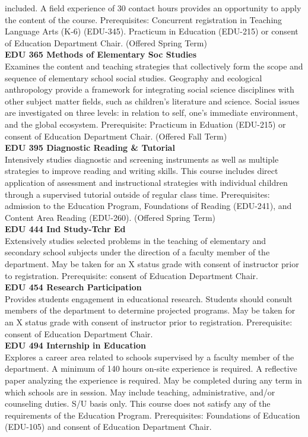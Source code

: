 \documentclass[
  letterpaper,
]{scrbook}
\begin{document}
included. A field experience of 30 contact hours provides an opportunity
to apply the content of the course. Prerequisites: Concurrent
registration in Teaching Language Arts (K-6) (EDU-345). Practicum in
Education (EDU-215) or consent of Education Department Chair. (Offered
Spring Term)\\
\textbf{EDU 365 Methods of Elementary Soc Studies}\\
Examines the content and teaching strategies that collectively form the
scope and sequence of elementary school social studies. Geography and
ecological anthropology provide a framework for integrating social
science disciplines with other subject matter fields, such as children's
literature and science. Social issues are investigated on three levels:
in relation to self, one's immediate environment, and the global
ecosystem. Prerequisite: Practicum in Eduation (EDU-215) or consent of
Education Department Chair. (Offered Fall Term)\\
\textbf{EDU 395 Diagnostic Reading \& Tutorial}\\
Intensively studies diagnostic and screening instruments as well as
multiple strategies to improve reading and writing skills. This course
includes direct application of assessment and instructional strategies
with individual children through a supervised tutorial outside of
regular class time. Prerequisites: admission to the Education Program,
Foundations of Reading (EDU-241), and Content Area Reading (EDU-260).
(Offered Spring Term)\\
\textbf{EDU 444 Ind Study-Tchr Ed}\\
Extensively studies selected problems in the teaching of elementary and
secondary school subjects under the direction of a faculty member of the
department. May be taken for an X status grade with consent of
instructor prior to registration. Prerequisite: consent of Education
Department Chair.\\
\textbf{EDU 454 Research Participation}\\
Provides students engagement in educational research. Students should
consult members of the department to determine projected programs. May
be taken for an X status grade with consent of instructor prior to
registration. Prerequisite: consent of Education Department Chair.\\
\textbf{EDU 494 Internship in Education}\\
Explores a career area related to schools supervised by a faculty member
of the department. A minimum of 140 hours on-site experience is
required. A reflective paper analyzing the experience is required. May
be completed during any term in which schools are in session. May
include teaching, administrative, and/or counseling duties. S/U basis
only. This course does not satisfy any of the requirements of the
Education Program. Prerequisites: Foundations of Education (EDU-105) and
consent of Education Department Chair.
\end{document}
